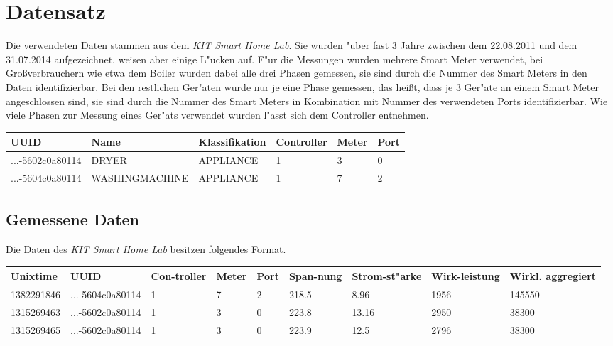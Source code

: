 \section{Datensatz}
\label{Datensatz}

Die verwendeten Daten stammen aus dem \textit{KIT Smart Home Lab}. Sie wurden "uber fast 3 Jahre zwischen dem 22.08.2011 und dem 31.07.2014 aufgezeichnet, weisen aber einige L"ucken auf. F"ur die Messungen wurden mehrere Smart Meter verwendet, bei Gro{\ss}verbrauchern wie etwa dem Boiler wurden dabei alle drei Phasen gemessen, sie sind durch die Nummer des Smart Meters in den Daten identifizierbar. Bei den restlichen Ger"aten wurde nur je eine Phase gemessen, das hei{\ss}t, dass je 3 Ger"ate an einem Smart Meter angeschlossen sind, sie sind durch die Nummer des Smart Meters in Kombination mit Nummer des verwendeten Ports identifizierbar. Wie viele Phasen zur Messung eines Ger"ats verwendet wurden l"asst sich dem Controller entnehmen.
\begin{table}[h]
\begin{tabular}{l|l|l|l|l|l}
UUID & Name & Klassifikation & Controller & Meter & Port \\
\hline
...-5602c0a80114 & DRYER & APPLIANCE & 1 & 3 & 0 \\
...-5604c0a80114 & WASHINGMACHINE & APPLIANCE & 1 & 7 & 2
\end{tabular}
\end{table}



\subsection{Gemessene Daten}
\label{Gemessene Daten}

Die Daten des \textit{KIT Smart Home Lab} besitzen folgendes Format. \\
\begin{table}[h]
\begin{tabular}{l|l|p{1cm}|p{1cm}|p{1cm}|p{1cm}|p{1cm}|p{1.2cm}|p{2cm}}
Unixtime & UUID & Con-troller & Meter & Port & Span-nung & Strom-st"arke & Wirk-leistung & Wirkl. \newline aggregiert \\
\hline
1382291846 & ...-5604c0a80114 & 1 & 7 & 2 & 218.5 & 8.96 & 1956 & 145550  \\
1315269463 & ...-5602c0a80114 & 1 & 3 & 0 & 223.8 & 13.16 & 2950 & 38300 \\
1315269465 & ...-5602c0a80114 & 1 & 3 & 0 & 223.9 & 12.5 & 2796 & 38300
\end{tabular}
\end{table}

